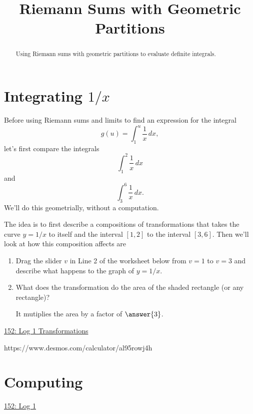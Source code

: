 \documentclass{ximera}
\title{Riemann Sums with Geometric Partitions}
\begin{document}
\begin{abstract}
Using Riemann sums with geometric partitions to evaluate definite integrals.
\end{abstract}
\maketitle



\section{Integrating $1/x$}

Before using Riemann sums and limits to find an expression for the integral
\[
    g(u) = \int_1^u \frac{1}{x}\, dx ,
\]
let's first compare the integrals %
\[
      \int_1^2 \frac{1}{x}\, dx
\]
and 
\[
      \int_3^6 \frac{1}{x}\, dx.
\]
We'll do this geometrially, without a computation.

The idea is to first describe a compositions of transformations that takes the curve $y=1/x$ to itself and the interval $[1,2]$ to the interval $[3,6]$. Then we'll look at how this composition affects are

\begin{exploration}  \label{Ex:LdkDERer4}

\begin{enumerate}
\item Drag the slider $v$ in Line 2 of the worksheet below from $v=1$ to $v=3$ and describe what happens to the graph of $y=1/x$.

\begin{freeResponse}
\end{freeResponse}

\item What does the transformation do the area of the shaded rectangle (or any rectangle)?

It mutiplies the area by a factor of $\answer{3}$.

\end{enumerate}

\begin{onlineOnly}
    \begin{center}
\end{center}
\end{onlineOnly}

\href{https://www.desmos.com/calculator/al95rowj4h}{152: Log 1 Transformations}


https://www.desmos.com/calculator/al95rowj4h


\end{exploration}



\section{Computing}

\begin{onlineOnly}
    \begin{center}
\end{center}
\end{onlineOnly}

\href{https://www.desmos.com/calculator/rbcbxdrvcp}{152: Log 1}
\end{document}
